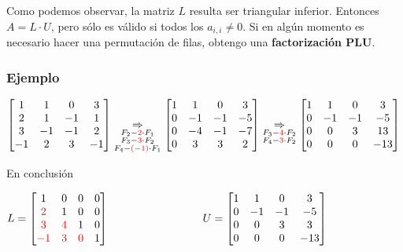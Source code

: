 \documentclass[]{article}
\begin{document}
Como podemos observar, la matriz $L$ resulta ser triangular inferior. Entonces $A=L\cdot U$, pero sólo es válido si todos los $a_{i,i} \neq 0$. Si en algún momento es necesario hacer una permutación de filas, obtengo una \textbf{factorización PLU}.


\subsubsection{Ejemplo}
\begin{center}
	$\begin{bmatrix}
		1&1&0&3\\
		2&1&-1&1\\
		3&-1&-1&2\\
		-1&2&3&-1
	\end{bmatrix}\underset{\substack{ F_2 - \mathbin{\color{red}{2}}\cdot F_1\\ F_3-\mathbin{\color{red}{3}}\cdot F_2 \\ F_4-\mathbin{\color{red}{(-1)}}\cdot F_1 }}{\Rightarrow}
	\begin{bmatrix}
		1&1&0&3\\
		0&-1&-1&-5\\
		0&-4&-1&-7\\
		0&3&3&2
	\end{bmatrix}\underset{\substack{ F_3 - \mathbin{\color{red}{4}}\cdot F_2\\ F_4-\mathbin{\color{red}{3}}\cdot F_2}}{\Rightarrow}
	\begin{bmatrix}
		1&1&0&3\\
		0&-1&-1&-5\\
		0&0&3&13\\
		0&0&0&-13
	\end{bmatrix}$
\end{center}

En conclusión

\begin{center}
	$L = \begin{bmatrix}
			1&0&0&0\\
			\rojo{2}&1&0&0\\
			\rojo{3}&\rojo{4}&1&0\\
			\rojo{-1}&\rojo{3}&\rojo{0}&1
		\end{bmatrix} \hspace{3cm} U = \begin{bmatrix}
			1&1&0&3\\
			0&-1&-1&-5\\
			0&0&3&3\\
			0&0&0&-13
		\end{bmatrix}$
\end{center}
\end{document}
